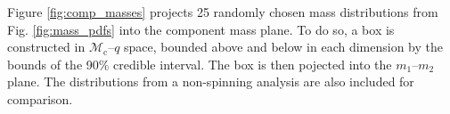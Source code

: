 Figure \ref{fig:comp_masses} projects 25 randomly chosen mass distributions from Fig. \ref{fig:mass_pdfs} into the component mass plane.  To do so, a box is constructed in $\mathcal{M}_\mathrm{c}$--$q$ space, bounded above and below in each dimension by the bounds of the 90\% credible interval.  The box is then pojected into the $m_1$--$m_2$ plane.  The distributions from a non-spinning analysis are also included for comparison.